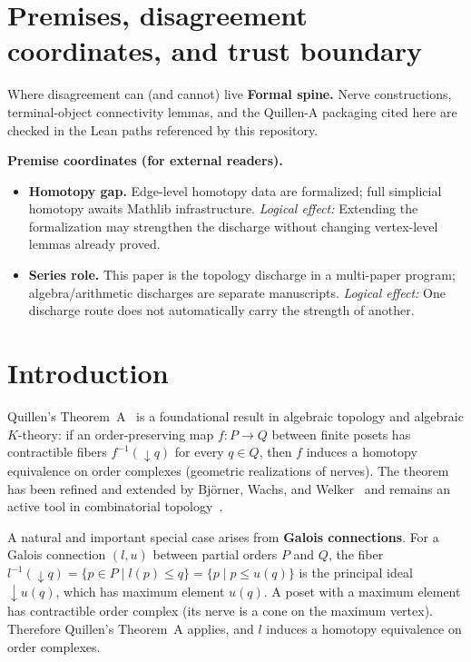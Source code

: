 \documentclass[11pt]{article}
\begin{document}
\section{Premises, disagreement coordinates, and trust boundary}\label{sec:premises-ic-quillen}
\begin{keybox}{Where disagreement can (and cannot) live}
\textbf{Formal spine.}
Nerve constructions, terminal-object connectivity lemmas, and the Quillen-A packaging cited here are checked in the Lean paths referenced by this repository.

\medskip
\textbf{Premise coordinates (for external readers).}
{\raggedright
\begin{itemize}[leftmargin=2em]
\item \textbf{Homotopy gap.} Edge-level homotopy data are formalized; full simplicial homotopy awaits Mathlib infrastructure.
  \emph{Logical effect:} Extending the formalization may strengthen the discharge without changing vertex-level lemmas already proved.
\item \textbf{Series role.} This paper is the topology discharge in a multi-paper program; algebra/arithmetic discharges are separate manuscripts.
  \emph{Logical effect:} One discharge route does not automatically carry the strength of another.
\end{itemize}
\par}
\end{keybox}

\tableofcontents
\newpage

\section{Introduction}\label{sec:intro}

Quillen's Theorem~A~\cite{Quillen1978} is a foundational result in algebraic
topology and algebraic $K$-theory: if an order-preserving map $f : P \to Q$
between finite posets has contractible fibers $f^{-1}(\downarrow q)$ for every
$q \in Q$, then $f$ induces a homotopy equivalence on order complexes
(geometric realizations of nerves). The theorem has been refined and extended
by Bj\"orner, Wachs, and Welker~\cite{BWW2004} and remains an active tool in
combinatorial topology~\cite{Barmak2010}.

A natural and important special case arises from \textbf{Galois connections}.
For a Galois connection $(l, u)$ between partial orders $P$ and $Q$, the fiber
$l^{-1}(\downarrow q) = \{p \in P \mid l(p) \le q\} = \{p \mid p \le u(q)\}$
is the principal ideal $\downarrow u(q)$, which has maximum element $u(q)$.
A poset with a maximum element has contractible order complex (its nerve is a
cone on the maximum vertex). Therefore Quillen's Theorem~A applies, and $l$
induces a homotopy equivalence on order complexes.
\end{document}
